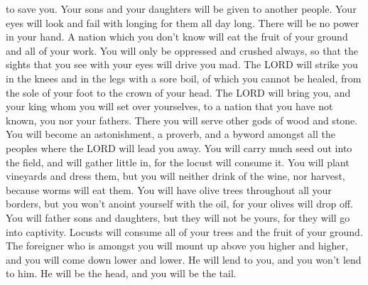 to save you.  Your sons and your daughters will be given to
another people. Your eyes will look and fail with longing for them all
day long. There will be no power in your hand.  A nation
which you don't know will eat the fruit of your ground and all of your
work. You will only be oppressed and crushed always,  so
that the sights that you see with your eyes will drive you mad.
 The LORD will strike you in the knees and in the legs with
a sore boil, of which you cannot be healed, from the sole of your foot
to the crown of your head.  The LORD will bring you, and
your king whom you will set over yourselves, to a nation that you have
not known, you nor your fathers. There you will serve other gods of wood
and stone.  You will become an astonishment, a proverb, and
a byword amongst all the peoples where the LORD will lead you away.
 You will carry much seed out into the field, and will
gather little in, for the locust will consume it.  You will
plant vineyards and dress them, but you will neither drink of the wine,
nor harvest, because worms will eat them.  You will have
olive trees throughout all your borders, but you won't anoint yourself
with the oil, for your olives will drop off.  You will
father sons and daughters, but they will not be yours, for they will go
into captivity.  Locusts will consume all of your trees and
the fruit of your ground.  The foreigner who is amongst you
will mount up above you higher and higher, and you will come down lower
and lower.  He will lend to you, and you won't lend to him.
He will be the head, and you will be the tail.

